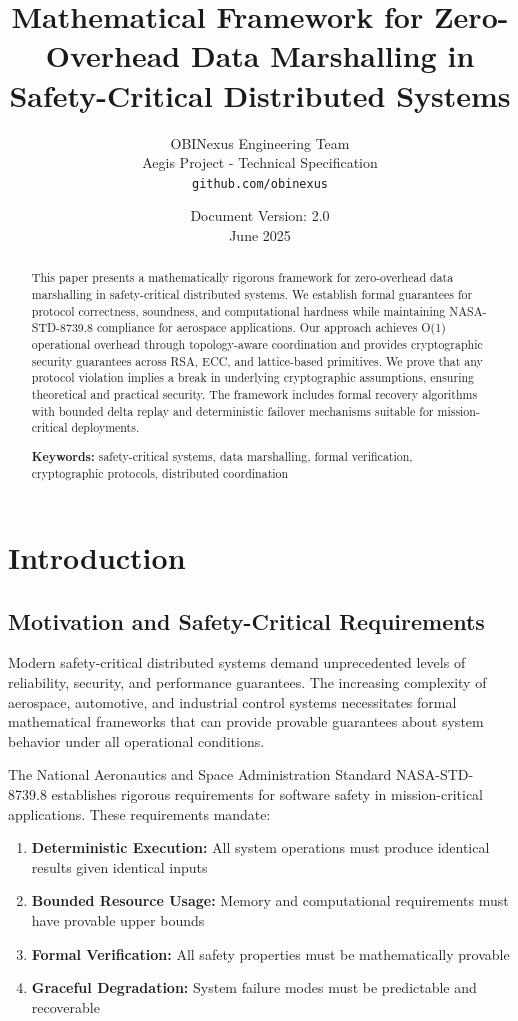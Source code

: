 \documentclass[11pt,a4paper]{article}
\title{\textbf{Mathematical Framework for Zero-Overhead Data Marshalling in Safety-Critical Distributed Systems}}
\author{OBINexus Engineering Team\\
Aegis Project - Technical Specification\\
\texttt{github.com/obinexus}}
\date{Document Version: 2.0\\June 2025}
\theoremstyle{definition}
\theoremstyle{remark}
\begin{document}
\maketitle

\begin{abstract}
This paper presents a mathematically rigorous framework for zero-overhead data marshalling in safety-critical distributed systems. We establish formal guarantees for protocol correctness, soundness, and computational hardness while maintaining NASA-STD-8739.8 compliance for aerospace applications. Our approach achieves O(1) operational overhead through topology-aware coordination and provides cryptographic security guarantees across RSA, ECC, and lattice-based primitives. We prove that any protocol violation implies a break in underlying cryptographic assumptions, ensuring theoretical and practical security. The framework includes formal recovery algorithms with bounded delta replay and deterministic failover mechanisms suitable for mission-critical deployments.

\textbf{Keywords:} safety-critical systems, data marshalling, formal verification, cryptographic protocols, distributed coordination
\end{abstract}

\section{Introduction}

\subsection{Motivation and Safety-Critical Requirements}

Modern safety-critical distributed systems demand unprecedented levels of reliability, security, and performance guarantees. The increasing complexity of aerospace, automotive, and industrial control systems necessitates formal mathematical frameworks that can provide provable guarantees about system behavior under all operational conditions.

The National Aeronautics and Space Administration Standard NASA-STD-8739.8 \cite{nasa8739} establishes rigorous requirements for software safety in mission-critical applications. These requirements mandate:

\begin{enumerate}
    \item \textbf{Deterministic Execution:} All system operations must produce identical results given identical inputs
    \item \textbf{Bounded Resource Usage:} Memory and computational requirements must have provable upper bounds
    \item \textbf{Formal Verification:} All safety properties must be mathematically provable
    \item \textbf{Graceful Degradation:} System failure modes must be predictable and recoverable
\end{enumerate}
\end{document}

